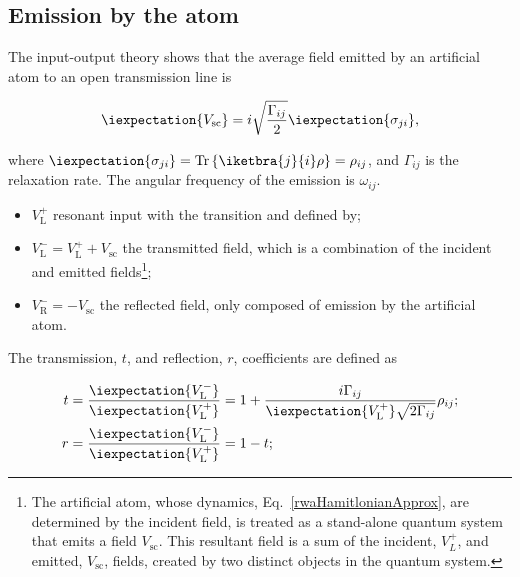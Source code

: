\subsection{Emission by the atom\label{subsec:Scattering}}
\begin{framed}\noindent
  The input-output  theory shows  that the average  field emitted  by an
  artificial atom to an open transmission line is

\begin{equation}\label{theoEmission}
  \iexpectation{V_{\text{sc}}} =  i\sqrt{\frac{\Gamma_{ij}}{2}}\iexpectation{\sigma_{ji}},
\end{equation}
\end{framed}

\noindent                                                          where
$    \iexpectation{\sigma_{ji}}=\text{Tr}\left\lbrace    \iketbra{j}{i}\rho
\right\rbrace   =   \rho_{ij}   $,   and  $   \Gamma_{ij}   $   is   the
\ilra{}  relaxation rate.   The angular  frequency of  the
emission is $ \omega_{ij} $.
\begin{itemize}
\item $ V_{\text{L}}^{+} $ resonant input with the \ilra{}
  transition and defined by;
\item   $   V_{\text{L}}^{-}   =   V_{\text{L}}^{+}+V_{\text{sc}}$   the
  transmitted field, which is a  combination of the incident and emitted
  fields\footnote{The      artificial     atom,      whose     dynamics,
    Eq.~\eqref{rwaHamitlonianApprox},  are  determined by  the  incident
    field, is treated as a stand-alone quantum system that emits a field
    $ V_{\text{sc}} $.   This resultant field is a sum  of the incident,
    $V_{L}^{+} $, and emitted, $ V_{\text{sc}} $, fields, created by two
    distinct objects in the quantum system.};
\item $  V_{\text{R}}^{-} = -  V_{\text{sc}}$ the reflected  field, only
  composed of emission by the artificial atom.
\end{itemize}

The transmission, $ t $, and reflection, $ r $, coefficients are defined
as

\begin{equation}\label{theoRefTran}
  \begin{aligned}
    t & = \frac{\iexpectation{V_{\text{L}}^{-}}}{\iexpectation{V_{\text{L}}^{+}}} = 1+\frac{i\Gamma_{ij}}{\iexpectation{V_{\text{L}}^{+}}\sqrt{2\Gamma_{ij}}}\rho_{ij};\\
    r                                 &                                =
    \frac{\iexpectation{V_{\text{L}}^{-}}}{\iexpectation{V_{\text{L}}^{+}}}
    = 1-t;
  \end{aligned}
\end{equation}

